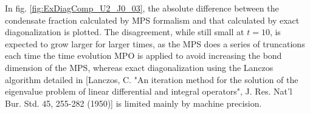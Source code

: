 In fig. \ref{fig:ExDiagComp_U2_J0_03}, the absolute difference between the condensate fraction calculated by MPS formalism and that calculated by exact diagonalization is plotted. The disagreement, while still small at $t=10$, is expected to grow larger for larger times, as the MPS does a series of truncations each time the time evolution MPO is applied to avoid increasing the bond dimension of the MPS, whereas exact diagonalization using the Lanczos algorithm detailed in [Lanczos, C. "An iteration method for the solution of the eigenvalue problem of linear differential and integral operators", J. Res. Nat’l Bur. Std. 45, 255-282 (1950)] is limited mainly by machine precision.